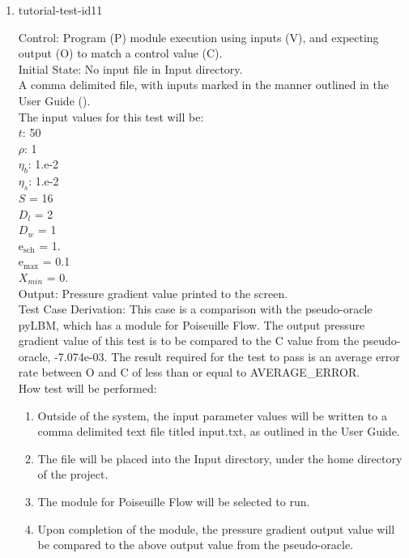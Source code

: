 \documentclass[12pt, titlepage]{article}
\begin{document}
\begin{enumerate}

\item{tutorial-test-id11\\}

Control: Program (P) module execution using inputs (V), and expecting output (O) to match a control value (C).\\
					
Initial State: No input file in Input directory.\\
					
A comma delimited file, with inputs marked in the manner outlined in the User Guide (\citet{LBM_UserGuide_PM}).\\The input values for this test will be:\\
$t$: 50\\
$\rho$: 1\\
$\eta_b$: 1.e-2\\
$\eta_s$: 1.e-2\\
$S$ = 16\\
$D_{l}$ = 2\\
$D_{w}$ = 1\\
$\mathrm{e_{sch}}$ = 1.\\
$\mathrm{e_{max}}$ = 0.1\\
$X_{min}$ = 0.\\

					
Output: Pressure gradient value printed to the screen.  \\

Test Case Derivation: This case is a comparison with the pseudo-oracle pyLBM, which has a module for Poiseuille Flow. The output pressure gradient value of this test is to be compared to the C value from the pseudo-oracle, -7.074e-03. The result required for the test to pass is an average error rate between O and C of less than or equal to AVERAGE\_ERROR.\\

					
How test will be performed: 

\begin{enumerate}
\item Outside of the system, the input parameter values will be written to a comma delimited text file titled input.txt, as outlined in the User Guide.
\item The file will be placed into the Input directory, under the home directory of the project.
\item The module for Poiseuille Flow will be selected to run.
\item Upon completion of the module, the pressure gradient output value will be compared to the above output value from the pseudo-oracle.
\end{enumerate}			


\end{enumerate}
\end{document}
